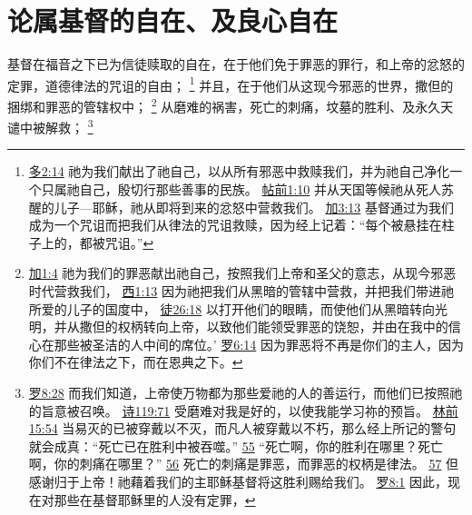 \documentclass[12pt, a4paper, oneside]{ctexart}
\newcounter{parnum}[section]
\newcommand{\N}{%
   \noindent\refstepcounter{parnum}%
    \makebox[\parindent][l]{\textbf{\arabic{parnum}.}}}
\begin{document}
\section{论属基督的自在、及良心自在}

\N 基督在福音之下已为信徒赎取的自在，在于他们免于罪恶的罪行，和上帝的忿怒的定罪，道德律法的咒诅的自由；
	\footnote {
		\href{https://biblehub.com/titus/2-14.htm}{多2:14} 祂为我们献出了祂自己，以从所有邪恶中救赎我们，并为祂自己净化一个只属祂自己，殷切行那些善事的民族。
		\href{https://biblehub.com/1_thessalonians/1-10.htm}{帖前1:10} 并从天国等候祂从死人苏醒的儿子---耶稣，祂从即将到来的忿怒中营救我们。
		\href{https://biblehub.com/galatians/3-13.htm}{加3:13} 基督通过为我们成为一个咒诅而把我们从律法的咒诅救赎，因为经上记着：“每个被悬挂在柱子上的，都被咒诅。”
	}
	并且，在于他们从这现今邪恶的世界，撒但的捆绑和罪恶的管辖权中；
	\footnote {
		\href{https://biblehub.com/galatians/1-4.htm}{加1:4} 祂为我们的罪恶献出祂自己，按照我们上帝和圣父的意志，从现今邪恶时代营救我们，
		\href{https://biblehub.com/colossians/1-13.htm}{西1:13} 因为祂把我们从黑暗的管辖中营救，并把我们带进祂所爱的儿子的国度中，
		\href{https://biblehub.com/acts/26-18.htm}{徒26:18} 以打开他们的眼睛，而使他们从黑暗转向光明，并从撒但的权柄转向上帝，以致他们能领受罪恶的饶恕，并由在我中的信心在那些被圣洁的人中间的席位。’
		\href{https://biblehub.com/romans/6-14.htm}{罗6:14} 因为罪恶将不再是你们的主人，因为你们不在律法之下，而在恩典之下。
	}
	从磨难的祸害，死亡的刺痛，坟墓的胜利、及永久天谴中被解救；
	\footnote {
		\href{https://biblehub.com/romans/8-28.htm}{罗8:28} 而我们知道，上帝使万物都为那些爱祂的人的善运行，而他们已按照祂的旨意被召唤。
		\href{https://biblehub.com/psalms/119-71.htm}{诗119:71} 受磨难对我是好的，以使我能学习祢的预旨。
		\href{https://biblehub.com/1_corinthians/15-54.htm}{林前15:54} 当易灭的已被穿戴以不灭，而凡人被穿戴以不朽，那么经上所记的警句就会成真：“死亡已在胜利中被吞噬。”
		\href{https://biblehub.com/1_corinthians/15-55.htm}{55} “死亡啊，你的胜利在哪里？死亡啊，你的刺痛在哪里？”
		\href{https://biblehub.com/1_corinthians/15-56.htm}{56} 死亡的刺痛是罪恶，而罪恶的权柄是律法。
		\href{https://biblehub.com/1_corinthians/15-57.htm}{57} 但感谢归于上帝！祂藉着我们的主耶稣基督将这胜利赐给我们。
		\href{https://biblehub.com/romans/8-1.htm}{罗8:1} 因此，现在对那些在基督耶稣里的人没有定罪，
	}
\end{document}
